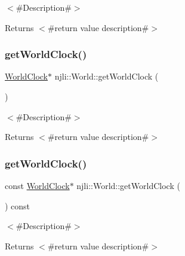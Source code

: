 $<$\#\+Description\#$>$

\begin{DoxyReturn}{Returns}
$<$\#return value description\#$>$ 
\end{DoxyReturn}
\mbox{\label{classnjli_1_1_world_a00797432cd913a07ad852e703cbf7278}} 
\subsubsection{\texorpdfstring{get\+World\+Clock()}{getWorldClock()}\hspace{0.1cm}{\footnotesize\ttfamily [1/2]}}
{\footnotesize\ttfamily \mbox{\hyperlink{classnjli_1_1_world_clock}{World\+Clock}}$\ast$ njli\+::\+World\+::get\+World\+Clock (\begin{DoxyParamCaption}{ }\end{DoxyParamCaption})}

$<$\#\+Description\#$>$

\begin{DoxyReturn}{Returns}
$<$\#return value description\#$>$ 
\end{DoxyReturn}
\mbox{\label{classnjli_1_1_world_a7edeaa8b2caed5240128952e85ea5b12}} 
\subsubsection{\texorpdfstring{get\+World\+Clock()}{getWorldClock()}\hspace{0.1cm}{\footnotesize\ttfamily [2/2]}}
{\footnotesize\ttfamily const \mbox{\hyperlink{classnjli_1_1_world_clock}{World\+Clock}}$\ast$ njli\+::\+World\+::get\+World\+Clock (\begin{DoxyParamCaption}{ }\end{DoxyParamCaption}) const}

$<$\#\+Description\#$>$

\begin{DoxyReturn}{Returns}
$<$\#return value description\#$>$ 
\end{DoxyReturn}
\mbox{\label{classnjli_1_1_world_a28299874538b8a714bcbae908760a364}} 
